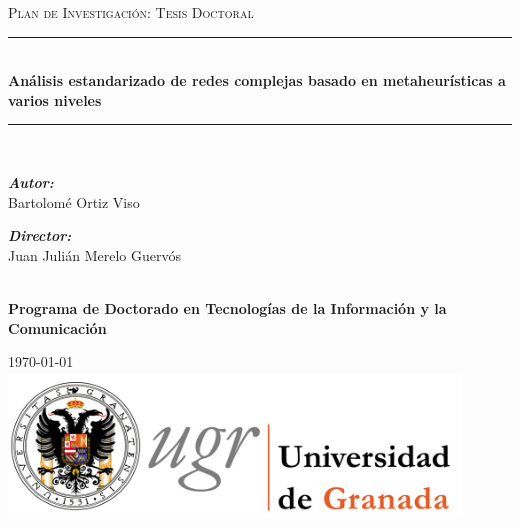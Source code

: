 \documentclass[12pt]{article}
\begin{document}
\begin{titlepage}
  \newcommand{\HRule}{\rule{\linewidth}{0.1mm}}
  \center %
 
  \textsc{\Large Plan de Investigación: Tesis Doctoral}\\[0.5cm]

  \HRule \\[0.4cm]
  { \huge \bfseries Análisis estandarizado de redes complejas basado
    en metaheurísticas a varios niveles
  }\\[0.1cm] %
  \HRule \\[1.5cm]
 

  \begin{minipage}{0.6\textwidth}
    \begin{flushleft} \large

      \emph{\bf{Autor:}}\\
      Bartolomé Ortiz Viso

      \vspace*{20px}

      \emph{\bf{Director:}} \\
      Juan Julián Merelo Guervós
    \end{flushleft}
  \end{minipage}\\[1cm]
  \large{\bf{Programa de Doctorado en Tecnologías de la Información y
      la Comunicación}} \vspace*{50px}

  {\large
    \today}\\[1cm] %
  \vspace*{10px}
  \includegraphics[width=12cm,height=4cm]{logougr.jpg}%
  \vfill %

\end{titlepage}
\end{document}
